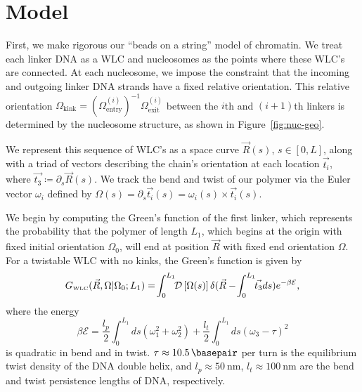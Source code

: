 \documentclass[%
 reprint,
superscriptaddress,
showpacs,preprintnumbers,
 amsmath,amssymb,
 aps,
 prl,
]{revtex4-1}
\newcommand{\gwlc}[2][\Omega_0; L_0]{G_\text{\tiny WLC}(#2|#1)}
\newcommand{\greens}[2][\Omega_0; L]{G(#2|#1)}
\newcommand{\pathd}[1]{\mathcal{D}\left[#1\right]}
\newcommand{\energy}{\mathcal{E}}
\begin{document}

\section{\label{sec:model}Model}
First, we make rigorous our ``beads on a string'' model of chromatin.
We treat each linker DNA as a WLC and nucleosomes as the points where these
    WLC's are connected.
At each nucleosome, we impose the constraint that the incoming and outgoing
    linker DNA strands have a fixed relative orientation. This relative
    orientation $\Omega_\text{kink}  = {(\Omega^{(i)}_\text{entry})}^{-1}
    \Omega^{(i)}_\text{exit}$ between the $i$th and $(i+1)$th linkers is
    determined by the nucleosome structure, as shown in
    Figure~\ref{fig:nuc-geo}.

We represent this sequence of WLC's as a space curve $\vec{R}(s)$, $s\in[0,L]$, along
    with a triad of vectors describing the chain's orientation at each location
    $\vec{t_i}$, where $\vec{t_3} \coloneqq \partial_s \vec{R}(s)$.
We track the bend and twist of our polymer via the Euler vector $\omega_i$
    defined by ${\Omega(s) = \partial_s \vec{t_i}(s) = \omega_i(s) \times
    \vec{t_i}(s)}$.

We begin by computing the Green's function of the first linker, which represents
the probability that the polymer of length $L_1$, which begins at
the origin with fixed initial orientation $\Omega_0$, will end at position
$\vec{R}$ with fixed end orientation $\Omega$.
For a twistable WLC with no kinks, the Green's function is given by
\begin{equation}\label{eq:path}
    \gwlc[\Omega_0;L_1]{\vec{R}, \Omega} =\! \int_{0}^{L_1} \!\! \pathd{\Omega(s)}
              \delta(\vec{R} - \!\int_{0}^{L_1} \!\!\vec{t_3} ds)
              e^{-\beta \mathcal{E}},
\end{equation}
    where the energy
\begin{equation}\label{eq:energy}
    \beta\energy = \frac{l_p}{2}\int_{0}^{L_1} ds
    (\omega_1^2 + \omega_2 ^2) + \frac{l_t}{2}\int_{0}^{L_1} ds
    {\left(\omega_3 - \tau\right)}^2
\end{equation}
    is quadratic in bend and in twist. {$\tau \approx \SI{10.5}{\basepair}$}
    per turn is the equilibrium twist density of the DNA double helix, and {$l_p
    \approx \SI{50}{\nano\metre}$}, {$l_t \approx \SI{100}{\nano\metre}$} are
    the bend and twist persistence lengths of DNA, respectively.
\end{document}
